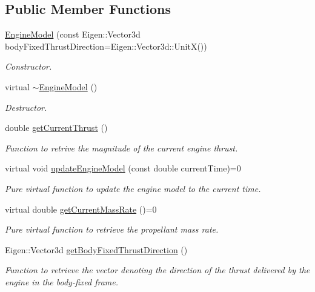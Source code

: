 \subsection*{Public Member Functions}
\begin{DoxyCompactItemize}
\item 
\hyperlink{classtudat_1_1system__models_1_1EngineModel_a0a770a9f91472482180d18b4524bc717}{Engine\+Model} (const Eigen\+::\+Vector3d body\+Fixed\+Thrust\+Direction=Eigen\+::\+Vector3d\+::\+UnitX())
\begin{DoxyCompactList}\small\item\em Constructor. \end{DoxyCompactList}\item 
virtual \hyperlink{classtudat_1_1system__models_1_1EngineModel_ac65de723c630a91dfdaf15e45b36f156}{$\sim$\+Engine\+Model} ()\hypertarget{classtudat_1_1system__models_1_1EngineModel_ac65de723c630a91dfdaf15e45b36f156}{}\label{classtudat_1_1system__models_1_1EngineModel_ac65de723c630a91dfdaf15e45b36f156}

\begin{DoxyCompactList}\small\item\em Destructor. \end{DoxyCompactList}\item 
double \hyperlink{classtudat_1_1system__models_1_1EngineModel_ae9116f135ec5d1c49cfc3f6c74c89ade}{get\+Current\+Thrust} ()
\begin{DoxyCompactList}\small\item\em Function to retrive the magnitude of the current engine thrust. \end{DoxyCompactList}\item 
virtual void \hyperlink{classtudat_1_1system__models_1_1EngineModel_acfe8c7ecd66348ad08d094990d79118f}{update\+Engine\+Model} (const double current\+Time)=0
\begin{DoxyCompactList}\small\item\em Pure virtual function to update the engine model to the current time. \end{DoxyCompactList}\item 
virtual double \hyperlink{classtudat_1_1system__models_1_1EngineModel_a9e07041546adda4c8618f204d06609f4}{get\+Current\+Mass\+Rate} ()=0
\begin{DoxyCompactList}\small\item\em Pure virtual function to retrieve the propellant mass rate. \end{DoxyCompactList}\item 
Eigen\+::\+Vector3d \hyperlink{classtudat_1_1system__models_1_1EngineModel_acb5bd9eebce45b35d9bd76455e95ff4b}{get\+Body\+Fixed\+Thrust\+Direction} ()
\begin{DoxyCompactList}\small\item\em Function to retrieve the vector denoting the direction of the thrust delivered by the engine in the body-\/fixed frame. \end{DoxyCompactList}\end{DoxyCompactItemize}
